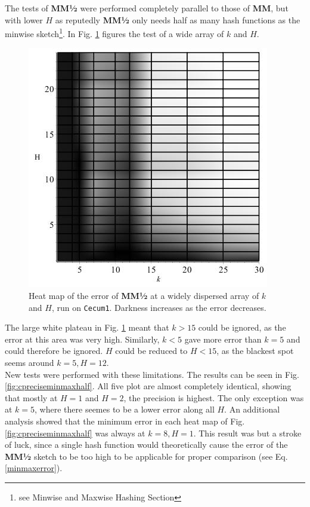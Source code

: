 \documentclass[../../main.tex]{subfiles}
\begin{document}
The tests of {\bf MM½} were performed completely parallel to those of {\bf MM}, but with lower $H$ as reputedly {\bf MM½} only needs half as many hash functions as the minwise sketch\footnote{see Minwise and Maxwise Hashing Section}. In Fig. \ref{fig:wiseCminmaxhalf} figures the test of a wide array of $k$ and $H$.
\begin{figure}[H]
\includegraphics[scale=0.5]{precision/minmaxhalf/cecum1wide.jpg}
\caption{Heat map of the error of {\bf MM½} at a widely dispersed array of $k$ and $H$, run on \texttt{Cecum1}. Darkness increases as the error decreases.}\label{fig:wiseCminmaxhalf}
\end{figure}

The large white plateau in Fig. \ref{fig:wiseCminmaxhalf} meant that $k>15$ could be ignored, as the error at this area was very high. Similarly, $k<5$ gave more error than $k=5$ and could therefore be ignored. $H$ could be reduced to $H< 15$, as the blackest spot seems around $k=5,H=12$.\\

New tests were performed with these limitations. The results can be seen in Fig. \ref{fig:cpreciseminmaxhalf}. All five plot are almost completely identical, showing that mostly at $H=1$ and $H=2$, the precision is highest. The only exception was at $k=5$, where there seemes to be a lower error along all $H$. An additional analysis showed that the minimum error in each heat map of Fig. \ref{fig:cpreciseminmaxhalf} was always at $k=8, H=1$. This result was but a stroke of luck, since a single hash function would theoretically cause the error of the {\bf MM½} sketch to be too high to be applicable for proper comparison (see Eq. \ref{minmaxerror}).\\
\end{document}
